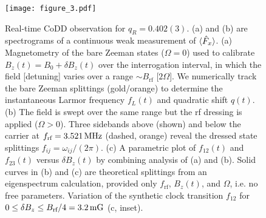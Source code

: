 \documentclass[aps,prl,reprint,superscriptaddress,floatfix]{revtex4-1}
\begin{document}
\begin{figure}
    \texttt{[image: figure\_3.pdf]}
    \caption{
    \label{fig:acquisition_pipeline}
        Real-time CoDD observation for $q_R = 0.402(3)$.
        (a) and (b) are spectrograms of a continuous weak measurement of $\langle \hat{F}_x \rangle$.
        (a) Magnetometry of the bare Zeeman states ($\Omega=0$) used to calibrate $B_z(t) = B_0 + \delta B_z(t)$ over the interrogation interval, in which the field [detuning] varies over a range $\sim B_{\text{rf}}$ [$2\Omega$].
        We numerically track the bare Zeeman splittings (gold/orange) to determine the instantaneous Larmor frequency $f_L(t)$ and quadratic shift $q(t)$.
       (b) The field is swept over the same range but the rf dressing is applied ($\Omega > 0$).
       Three sidebands above (shown) and below the carrier at $f_{\text{rf}}=\unit[3.521]{MHz}$ (dashed, orange) reveal the dressed state splittings $f_{ij} = \omega_{ij}/(2\pi)$.
       (c) A parametric plot of $f_{12}(t)$ and $f_{23}(t)$ versus $\delta B_z(t)$ by combining analysis of (a) and (b).
       Solid curves in (b) and (c) are theoretical splittings from an eigenspectrum calculation, provided only $f_{\text{rf}}$, $B_z(t)$, and $\Omega$, i.e. no free parameters.
       Variation of the synthetic clock transition $f_{12}$ for $0 \leq \delta B_z \leq B_{\text{rf}}/4 = \unit[3.2]{mG}$ (c, inset).
    }
\end{figure}
\end{document}
